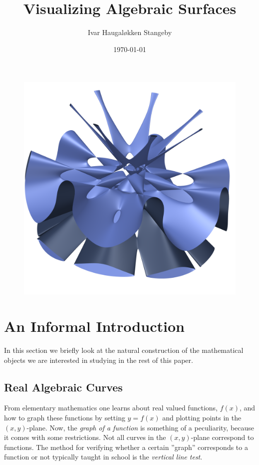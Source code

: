 \documentclass[a4paper]{article}
\title{Visualizing Algebraic Surfaces}
\author{Ivar Haugal{\o}kken Stangeby}
\date{\today}
\theoremstyle{definition}
\theoremstyle{plain}
\begin{document}
    \begin{titlepage}
    \maketitle

    \begin{figure}[htb]
        \centering
        \includegraphics[width=0.8\linewidth]{../pictures/labs_septic.png}
    \end{figure}
    \end{titlepage}
    \tableofcontents

    \section{An Informal Introduction}
    \label{sec:an_informal_introduction}
    
    In this section we briefly look at the natural construction of the
    mathematical objects we are interested in studying in the rest of this
    paper.

    \subsection{Real Algebraic Curves}
    \label{sub:real_algebraic_curves}
    
    From elementary mathematics one learns about real valued functions, $f(x)$,
    and how to graph these functions by setting $y = f(x)$ and plotting points
    in the $(x, y)$-plane. Now, the \emph{graph of a function} is something of
    a peculiarity, because it comes with some restrictions. Not all curves in
    the $(x, y)$-plane correspond to functions. The method for verifying
    whether a certain ''graph'' corresponds to a function or not typically
    taught in school is the \emph{vertical line test}. 
\end{document}
